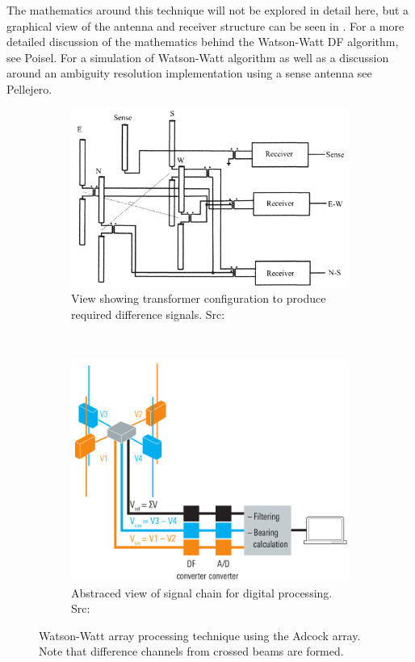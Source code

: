 The mathematics around this technique will not be explored in detail here, but a graphical view of the antenna and receiver structure can be seen in .
For a more detailed discussion of the mathematics behind the Watson-Watt DF algorithm, see Poisel\cite{poisel2008introduction}.
For a simulation of Watson-Watt algorithm as well as a discussion around an ambiguity resolution implementation using a sense antenna see Pellejero\cite{adcockwatsonwattrdf}.

\begin{figure}
  \centering
  \begin{subfigure}[b]{0.48\textwidth}
    \includegraphics[width=\textwidth]{./img/lit_review/watson-watt-processing-analogue}
    \caption{View showing transformer configuration to produce required difference signals. Src: \cite{poisel2008introduction}}
  \end{subfigure}
  ~
  \begin{subfigure}[b]{0.48\textwidth}
    \includegraphics[width=\textwidth]{./img/lit_review/watson-watt-processing-digital}
    \caption{Abstraced view of signal chain for digital processing. Src: \cite{rhode2000introtodf}}
  \end{subfigure}
  \caption{Watson-Watt array processing technique using the Adcock array. Note that difference channels from crossed beams are formed.}
  \label{fig:watson-watt}
\end{figure}

